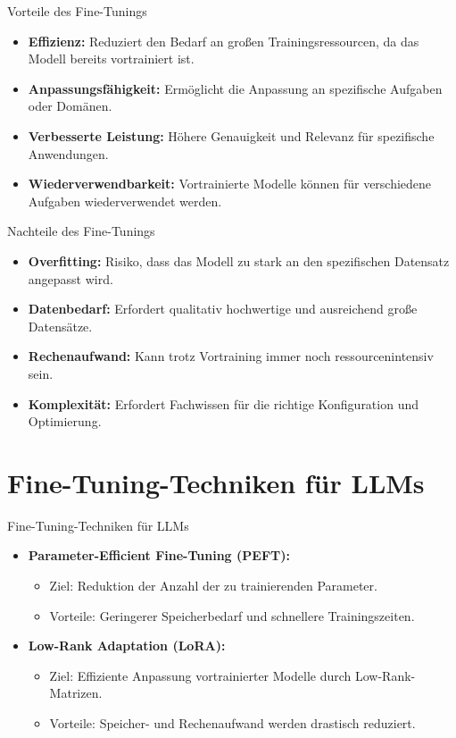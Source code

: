 \documentclass[aspectratio=1610, xcolor=dvipsnames, 9pt]{beamer}
\begin{document}
\begin{frame}{Vorteile des Fine-Tunings}
  \begin{itemize}
    \item \textbf{Effizienz:} Reduziert den Bedarf an großen Trainingsressourcen, da das Modell bereits vortrainiert ist.
    \item \textbf{Anpassungsfähigkeit:} Ermöglicht die Anpassung an spezifische Aufgaben oder Domänen.
    \item \textbf{Verbesserte Leistung:} Höhere Genauigkeit und Relevanz für spezifische Anwendungen.
    \item \textbf{Wiederverwendbarkeit:} Vortrainierte Modelle können für verschiedene Aufgaben wiederverwendet werden.
  \end{itemize}
\end{frame}

\begin{frame}{Nachteile des Fine-Tunings}
  \begin{itemize}
    \item \textbf{Overfitting:} Risiko, dass das Modell zu stark an den spezifischen Datensatz angepasst wird.
    \item \textbf{Datenbedarf:} Erfordert qualitativ hochwertige und ausreichend große Datensätze.
    \item \textbf{Rechenaufwand:} Kann trotz Vortraining immer noch ressourcenintensiv sein.
    \item \textbf{Komplexität:} Erfordert Fachwissen für die richtige Konfiguration und Optimierung.
  \end{itemize}
\end{frame}

\section{Fine-Tuning-Techniken für LLMs}

\begin{frame}{Fine-Tuning-Techniken für LLMs}
  \begin{itemize}
    \item \textbf{Parameter-Efficient Fine-Tuning (PEFT):}
      \begin{itemize}
        \item Ziel: Reduktion der Anzahl der zu trainierenden Parameter.
        \item Vorteile: Geringerer Speicherbedarf und schnellere Trainingszeiten.
      \end{itemize}
    \item \textbf{Low-Rank Adaptation (LoRA):}
      \begin{itemize}
        \item Ziel: Effiziente Anpassung vortrainierter Modelle durch Low-Rank-Matrizen.
        \item Vorteile: Speicher- und Rechenaufwand werden drastisch reduziert.
      \end{itemize}
  \end{itemize}
\end{frame}
\end{document}
